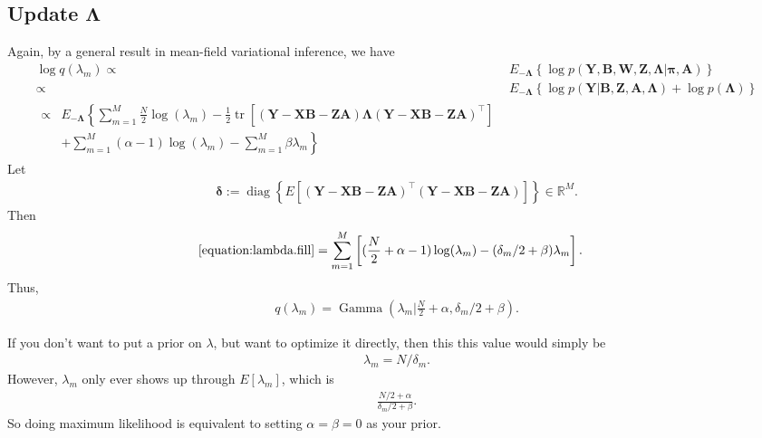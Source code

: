 \documentclass[11pt,authoryear]{article}
\DeclareMathOperator*{\diag}{diag}
\DeclareMathOperator*{\tr}{tr}
\DeclareMathOperator*{\gm}{Gamma}
\newcommand{\bs}[1]{\boldsymbol{#1}}
\begin{document}
\subsection{Update $\bs{\Lambda}$}
Again, by a general result in mean-field variational inference, we have
\begin{align}
\log q(\lambda_m)\propto& E_{-\bs{\Lambda}}\left\{\log p(\bs{Y},\bs{B},\bs{W},\bs{Z},\bs{\Lambda}|\bs{\pi},\bs{A})\right\}\\
\propto& E_{-\bs{\Lambda}}\left\{\log p(\bs{Y}|\bs{B}, \bs{Z}, \bs{A}, \bs{\Lambda}) + \log p(\bs{\Lambda})\right\}\\
\begin{split}
\label{equation:lambda.fill}
\propto& E_{-\bs{\Lambda}}\left\{ \sum_{m = 1}^{M}\frac{N}{2}\log(\lambda_m) - \frac{1}{2}\tr\left[(\bs{Y}-\bs{X}\bs{B}-\bs{Z}\bs{A})\bs{\Lambda}(\bs{Y}-\bs{X}\bs{B} - \bs{Z}\bs{A})^{\intercal}\right]\right.\\
 &\left.+ \sum_{m = 1}^M(\alpha - 1)\log(\lambda_m) - \sum_{m = 1}^M\beta\lambda_m\right\}
\end{split}
\end{align}
Let
\begin{align}
\label{equation:define.delta}
\bs{\delta} := \diag\left\{E\left[(\bs{Y}-\bs{X}\bs{B} - \bs{Z}\bs{A})^{\intercal}(\bs{Y}-\bs{X}\bs{B} - \bs{Z}\bs{A})\right]\right\} \in \mathbb{R}^{M}.
\end{align}
Then
\begin{align}
\eqref{equation:lambda.fill} &= \sum_{m = 1}^{M}\left[(\frac{N}{2} + \alpha - 1)\log(\lambda_m) - (\delta_m / 2 + \beta)\lambda_m\right].
\end{align}
Thus,
\begin{align}
q(\lambda_m) = \gm\left(\lambda_m| \frac{N}{2} + \alpha, \delta_m / 2 + \beta\right).
\end{align}

If you don't want to put a prior on $\lambda$, but want to optimize it directly, then this this value would simply be
\begin{align}
\lambda_m = N / \delta_m.
\end{align}
However, $\lambda_m$ only ever shows up through $E[\lambda_m]$, which is
\begin{align}
\frac{N/2 + \alpha}{\delta_m / 2 + \beta}.
\end{align}
So doing maximum likelihood is equivalent to setting $\alpha = \beta =
0$ as your prior.
\end{document}
